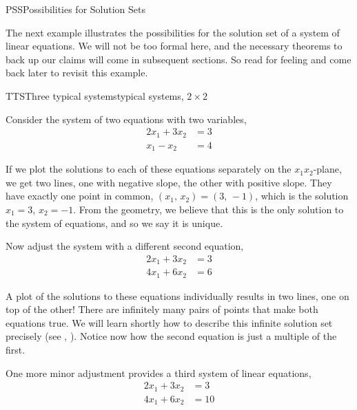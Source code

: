 %
\begin{subsect}{PSS}{Possibilities for Solution Sets}
\begin{para}The next example illustrates the possibilities for the solution set of a system of linear equations.  We will not be too formal here, and the necessary theorems to back up our claims will come in subsequent sections.  So read for feeling and come back later to revisit this example.\end{para}
%
\begin{example}{TTS}{Three typical systems}{typical systems, $2\times 2$}
\begin{para}Consider the system of two equations with two variables,
%
\begin{align*}
2x_1+3x_2&=3\\
x_1-x_2&=4
\end{align*}
\end{para}
%
\begin{para}If we plot the solutions to each of these equations separately on the $x_{1}x_{2}$-plane, we get two lines, one with negative slope, the other with positive slope.  They have exactly one point in common, $(x_1,\,x_2)=(3,\,-1)$, which is the solution $x_1=3$, $x_2=-1$.  From the geometry, we believe that this is the only solution to the system of equations, and so we say it is unique.\end{para}
%
\begin{para}Now adjust the system with a different second equation,
%
\begin{align*}
2x_1+3x_2&=3\\
4x_1+6x_2&=6
\end{align*}
\end{para}
%
\begin{para}A plot of the solutions to these equations individually results in two lines, one on top of the other!  There are infinitely many pairs of points that make both equations true.  We will learn shortly how to describe this infinite solution set precisely (see , ).  Notice now how the second equation is just a multiple of the first.\end{para}
%
\begin{para}One more minor adjustment provides a third system of linear equations,
%
\begin{align*}
2x_1+3x_2&=3\\
4x_1+6x_2&=10
\end{align*}
\end{para}

\end{example}
\end{subsect}
